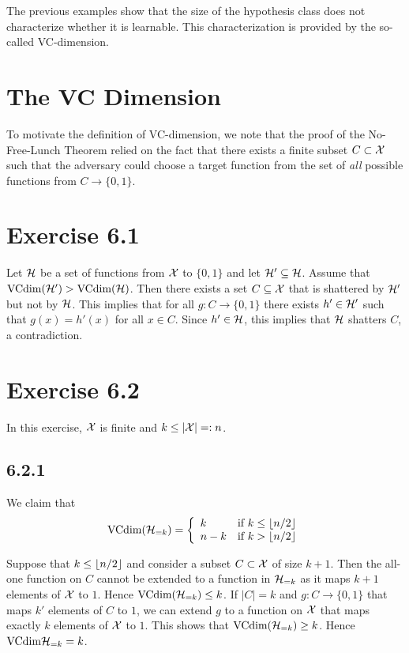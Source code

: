 The previous examples show that the size of the hypothesis class does not characterize
whether it is learnable. This characterization is provided by the so-called VC-dimension.

\section{The VC Dimension}

To motivate the definition of VC-dimension, we note that the proof of the No-Free-Lunch
Theorem relied on the fact that there exists a finite subset $C \subset \mathcal{X}$ such
that the adversary could choose a target function from the set of \emph{all} possible
functions from $C \rightarrow \{0, 1\}$.

\section*{Exercise 6.1}

Let $\mathcal{H}$ be a set of functions from $\mathcal{X}$ to $\{0, 1\}$ and
let $\mathcal{H}' \subseteq \mathcal{H}$. Assume that $\text{VCdim} (\mathcal{H}') > \text{VCdim}
(\mathcal{H})$.  Then there exists a set $C \subseteq \mathcal{X}$ that is shattered by
$\mathcal{H}'$ but not by $\mathcal{H}$.  This implies that for all $g \colon C
\rightarrow \{0, 1\}$ there exists $h' \in \mathcal{H}'$ such that $g(x) = h'(x)$
for all $x \in C$. Since $h' \in \mathcal{H}$, this implies that $\mathcal{H}$
shatters $C$, a contradiction.

\section*{Exercise 6.2}

In this exercise, $\mathcal{X}$ is finite and $k \leq |\mathcal{X}| =: n$.

\subsection*{6.2.1}

We claim that
\[\text{VCdim}(\mathcal{H}_{= k})
= \left \{ \begin{array}{ll}
                k     & \text{if } k \leq \left \lfloor n / 2 \right \rfloor \\
                n - k & \text{if } k > \left \lfloor n / 2 \right \rfloor
           \end{array} \right .
\]

Suppose that $k \leq \left \lfloor n / 2 \right \rfloor$ and consider a subset $C \subset \mathcal{X}$
of size $k + 1$. Then the all-one function on $C$ cannot be
extended to a function in $\mathcal{H}_{= k}$ as it maps $k + 1$ elements
of $\mathcal{X}$ to $1$. Hence $\text{VCdim}(\mathcal{H}_{= k}) \leq k$. If $|C| = k$
and $g \colon C \rightarrow \{0, 1\}$ that maps $k'$ elements of $C$ to $1$,
we can extend $g$ to a function on $\mathcal{X}$ that maps exactly $k$ elements of
$\mathcal{X}$ to $1$.  This shows that $\text{VCdim}(\mathcal{H}_{= k}) \geq k$. Hence
$\text{VCdim}{\ensuremath{\mathcal{H}}_{= k}} = k$.

